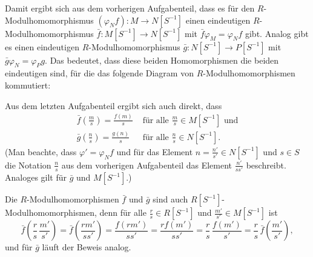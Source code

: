 \documentclass[a4paper,10pt]{article}
\theoremstyle{definition}
\begin{document}
Damit ergibt sich aus dem vorherigen Aufgabenteil, dass es für den $R$-Modul\-ho\-mo\-morphismus $(\varphi_N f) : M \rightarrow N[S^{-1}]$ einen eindeutigen $R$-Modulhomomorphismus $\bar{f} : M[S^{-1}] \rightarrow N[S^{-1}]$ mit $\bar{f} \varphi_M = \varphi_N f$ gibt. Analog gibt es einen eindeutigen $R$-Modulhomomorphismus $\bar{g} : N[S^{-1}] \rightarrow P[S^{-1}]$ mit $\bar{g} \varphi_N = \varphi_P g$. Das bedeutet, dass diese beiden Homomorphismen die beiden eindeutigen sind, für die das folgende Diagram von $R$-Modulhomomorphismen kommutiert:
\begin{center}
\end{center}

Aus dem letzten Aufgabenteil ergibt sich auch direkt, dass
\begin{align*}
 \bar{f}\left(\frac{m}{s}\right) = \frac{f(m)}{s} &\text{ für alle } \frac{m}{s} \in M[S^{-1}] \text{ und} \\
 \bar{g}\left(\frac{n}{s}\right) = \frac{g(n)}{s} &\text{ für alle } \frac{n}{s} \in N[S^{-1}].
\end{align*}
(Man beachte, dass $\varphi' = \varphi_N f$ und für das Element $n = \frac{n'}{s'} \in N[S^{-1}]$ und $s \in S$ die Notation $\frac{n}{s}$ aus dem vorherigen Aufgabenteil das Element $\frac{n'}{ss'}$ beschreibt. Analoges gilt für $\bar{g}$ und $M[S^{-1}]$.)

Die $R$-Modulhomomorphismen $\bar{f}$ und $\bar{g}$ sind auch $R[S^{-1}]$-Modulhomomorphismen, denn für alle $\frac{r}{s} \in R[S^{-1}]$ und $\frac{m'}{s'} \in M[S^{-1}]$ ist
\[
 \bar{f}\left( \frac{r}{s} \, \frac{m'}{s'} \right)
 = \bar{f}\left( \frac{rm'}{ss'} \right)
 = \frac{f(rm')}{ss'}
 = \frac{r f(m')}{ss'}
 = \frac{r}{s} \, \frac{f(m')}{s'}
 = \frac{r}{s} \, \bar{f}\left( \frac{m'}{s'} \right),
\]
und für $\bar{g}$ läuft der Beweis analog.
\end{document}
